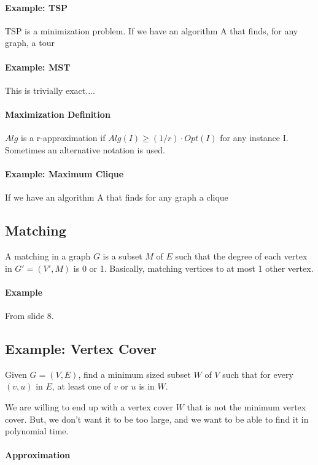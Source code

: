 \documentclass[a4paper]{article}
\begin{document}
\paragraph{Example: TSP}
TSP is a minimization problem. If we have an algorithm A that finds, for any graph, a tour 

\paragraph{Example: MST}
This is trivially exact....

\paragraph{Maximization Definition}
$Alg$ is a r-approximation if $Alg(I) \ge (1/r) \cdot Opt(I)$ for any instance I. Sometimes an alternative notation is used.

\paragraph{Example: Maximum Clique}
If we have an algorithm A that finds for any graph a clique


\subsection{Matching}
A matching in a graph $G$ is a subset $M$ of $E$ such that the degree of each vertex in $G'=(V',M)$ is 0 or 1. Basically, matching vertices to at most 1 other vertex.

\paragraph{Example}
From slide 8.

\subsection{Example: Vertex Cover}
Given $G=(V,E)$, find a minimum sized subset $W$ of $V$ such that for every $(v,u)$ in $E$, at least one of $v$ or $u$ is in $W$.

We are willing to end up with a vertex cover $W$ that is not the minimum vertex cover. But, we don't want it to be too large, and we want to be able to find it in polynomial time.

\paragraph{Approximation}
\end{document}
